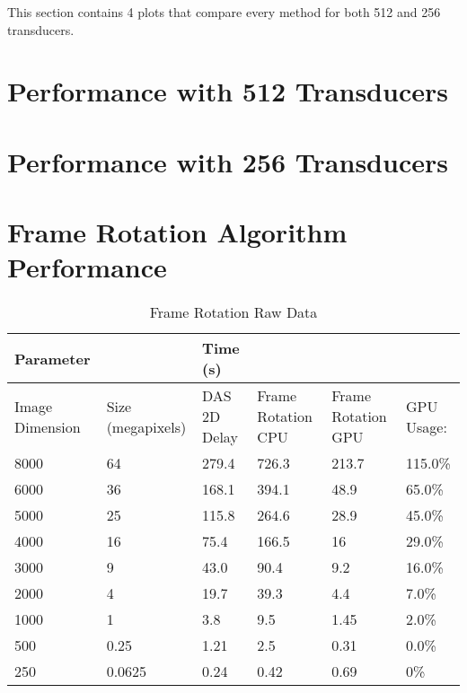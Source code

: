 \label{app:supp_plots}
\graphicspath{{C:/Users/cason/OneDrive/Documents/PSU/Project/02_MATLAB/05_DataOut/}}

This section contains 4 plots that compare every method for both 512 and 256 transducers.

\section{Performance with 512 Transducers}
\label{appA:512_transducerfigs}

\section{Performance with 256 Transducers}
\label{appA:256_transducerfigs}
\newpage

\section{Frame Rotation Algorithm Performance}
\label{appA:rotation_data}
\begin{table}[h]
    \caption{Frame Rotation Raw Data}
    \centering
    \begin{tabular}{|p{0.7in}|p{0.7in}|p{0.7in}|p{0.7in}|p{0.7in}|p{0.6in}|}
    \hline
        \small Parameter & ~ & \small Time (s) & ~ & ~ & ~ \\ \hline
        \scriptsize Image Dimension & \scriptsize Size (megapixels) & \scriptsize DAS 2D Delay & \scriptsize Frame Rotation CPU & \scriptsize Frame Rotation GPU & \scriptsize GPU Usage: \\ \hline
        8000 & 64 & 279.4 & 726.3 & 213.7 & 115.0\% \\ \hline
        6000 & 36 & 168.1 & 394.1 & 48.9 & 65.0\% \\ \hline
        5000 & 25 & 115.8 & 264.6 & 28.9 & 45.0\% \\ \hline
        4000 & 16 & 75.4 & 166.5 & 16 & 29.0\% \\ \hline
        3000 & 9 & 43.0 & 90.4 & 9.2 & 16.0\% \\ \hline
        2000 & 4 & 19.7 & 39.3 & 4.4 & 7.0\%  \\ \hline
        1000 & 1 & 3.8 & 9.5 & 1.45 & 2.0\% \\ \hline
        500 & 0.25 & 1.21 & 2.5 & 0.31 & 0.0\% \\ \hline
        250 & 0.0625 & 0.24 & 0.42 & 0.69 & 0\% \\ \hline
    \end{tabular}
\end{table}
\clearpage